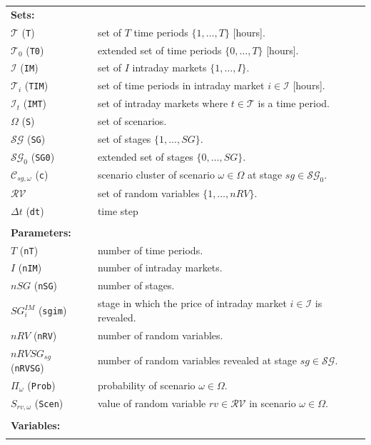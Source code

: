\documentclass{article}
\begin{document}
\begin{tabularx}{\textwidth}{l l}
    \textbf{Sets:} \\
    $\mathcal{T}$ (\verb|T|) & set of $T$ time periods $\{ 1, \dots, T \}$ [hours]. \\
	$\mathcal{T}_0$ (\verb|T0|) & extended set of time periods $\{ 0, \dots, T \}$ [hours]. \\     
	$\mathcal{I}$ (\verb|IM|) & set of $I$ intraday markets $\{1, \dots, I \}$. \\    
    $\mathcal{T}_i$ (\verb|TIM|) & set of time periods in intraday market $i \in \mathcal{I}$ [hours]. \\
	$\mathcal{I}_t$ (\verb|IMT|) & set of intraday markets where $t \in \mathcal{T}$ is a time period. \\    
	$\Omega$ (\verb|S|) & set of scenarios. \\
	$\mathcal{SG}$ (\verb|SG|) & set of stages $\{1, \dots, SG \}$. \\
	$\mathcal{SG}_0$ (\verb|SG0|) & extended set of stages $\{0, \dots, SG \}$. \\     
    $\mathcal{C}_{sg, \omega}$ (\verb|c|) & scenario cluster of scenario $\omega \in \Omega$ at stage $sg \in \mathcal{SG}_0$. \\
    $\mathcal{RV}$ & set of random variables $\{1, \dots, nRV \}$. \\
    $\Delta t$ (\verb|dt|) & time step\\
    \\
   
    
    \textbf{Parameters:} \\
	$T$ (\verb|nT|) & number of time periods. \\
	$I$ (\verb|nIM|) & number of intraday markets. \\
	$nSG$ (\verb|nSG|) & number of stages. \\
	$SG^{IM}_i$ (\verb|sgim|) & stage in which the price of intraday market $i \in \mathcal{I}$ is revealed. \\
	$nRV$ (\verb|nRV|) & number of random variables. \\
	$nRVSG_{sg}$ (\verb|nRVSG|) & number of random variables revealed at stage $sg \in \mathcal{SG}$. \\
	$\Pi_{\omega}$ (\verb|Prob|) & probability of scenario $\omega \in \Omega$. \\
	$S_{rv, \omega}$ (\verb|Scen|) & value of random variable $rv \in \mathcal{RV}$ in scenario $\omega \in \Omega$. \\    
    \\
       
    \textbf{Variables:} \\
	\\
\end{tabularx}
\end{document}
